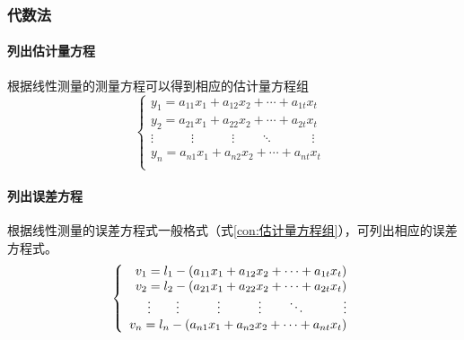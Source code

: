 \documentclass{ctexart}
\begin{document}
			\subsubsection{代数法}
				\paragraph{列出估计量方程}
					根据线性测量的测量方程可以得到相应的估计量方程组
					\begin{equation}
						\left \{
						\begin{array}{r}
							y_1=a_{11}x_1+a_{12}x_2+\cdots+a_{1t}x_t\\
							y_2=a_{21}x_1+a_{22}x_2+\cdots+a_{2t}x_t\\
							\vdots \qquad \quad \vdots \qquad \quad \vdots \qquad \ddots\quad\qquad \vdots\quad\\
							y_n=a_{n1}x_1+a_{n2}x_2+\cdots+a_{nt}x_t\\
						\end{array}
						\right.
						\label{con:估计量方程组}
					\end{equation}
				\paragraph{列出误差方程}
					根据线性测量的误差方程式一般格式（式\ref{con:估计量方程组}），可列出相应的误差方程式。
					\begin{equation*}
						\left \{
						\begin{array}{r}
							v_1=l_1-(a_{11}x_1+a_{12}x_2+\cdots+a_{1t}x_t)\\
							v_2=l_2-(a_{21}x_1+a_{22}x_2+\cdots+a_{2t}x_t)\\
							\vdots \qquad \vdots \qquad \quad \vdots \qquad \quad \vdots\qquad  \ddots\qquad\quad \vdots\space\space\space\space\\
							v_n=l_n-(a_{n1}x_1+a_{n2}x_2+\cdots+a_{nt}x_t)\\
						\end{array}
						\right.
					\end{equation*}
\end{document}
